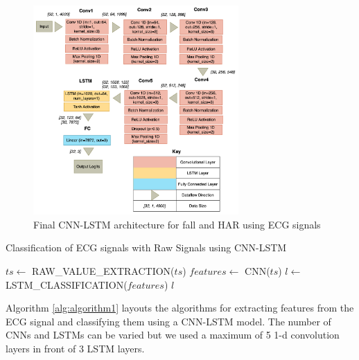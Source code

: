 \documentclass{ieeeaccess}
\begin{document}
\begin{figure}[ht]
\centerline{\includegraphics[width=18.5pc]{Definitions/final-cnnlstm-arch.png}}
\caption{Final CNN-LSTM architecture for fall and HAR using ECG signals}
\label{fig:cnnlstmArchitecture}
\end{figure}  




\begin{algorithm}
 \caption{Classification of ECG signals with Raw Signals using CNN-LSTM}
  \label{alg:algorithm1}
 \begin{algorithmic}[1]
 \renewcommand{\algorithmicrequire}{\textbf{Input:} A time series ECG raw data $ts$}
 \renewcommand{\algorithmicensure}{\textbf{Output:} The classified label $l$}
 \REQUIRE 
 \ENSURE  

\STATE $ts \leftarrow$  RAW\_VALUE\_EXTRACTION($ts$)
\STATE $features \leftarrow$ CNN($ts$)
\STATE $l \leftarrow$ LSTM\_CLASSIFICATION($features$)
 \RETURN $l$
\end{algorithmic}
\end{algorithm}
Algorithm \ref{alg:algorithm1} layouts the algorithms for extracting features from the ECG signal and classifying them using a CNN-LSTM model. The number of CNNs and LSTMs can be varied but we used a maximum of 5 1-d convolution layers in front of 3 LSTM layers.
\end{document}
